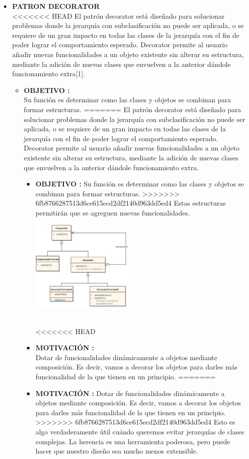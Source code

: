 \documentclass[twoside,twocolumn]{article}
\begin{document}
\begin{itemize}
    \item \textbf{PATRON DECORATOR} \\
<<<<<<< HEAD
    El patrón decorator está diseñado para solucionar problemas donde la jerarquía con subclasificación no puede ser aplicada, o se requiere de un gran impacto en todas las clases de la jerarquía con el fin de poder lograr el comportamiento esperado. Decorator permite al usuario añadir nuevas funcionalidades a un objeto existente sin alterar su estructura, mediante la adición de nuevas clases que envuelven a la anterior dándole funcionamiento extra[1]. 
	\begin{itemize}
		\item \textbf{OBJETIVO :}	\\Su función es determinar como las clases y objetos se combinan para formar estructuras.
=======
    El patrón decorator está diseñado para solucionar problemas donde la jerarquía con subclasificación no puede ser aplicada, o se requiere de un gran impacto en todas las clases de la jerarquía con el fin de poder lograr el comportamiento esperado. Decorator permite al usuario añadir nuevas funcionalidades a un objeto existente sin alterar su estructura, mediante la adición de nuevas clases que envuelven a la anterior dándole funcionamiento extra. 
	\begin{itemize}
		\item \textbf{OBJETIVO :}	Su función es determinar como las clases y objetos se combinan para formar estructuras.
>>>>>>> 6fb8766287513d6ce615ecd2df2140d963dd5ed4
        Estas estructuras permitirán que se agreguen nuevas funcionalidades.
        
        \begin{center}
            \includegraphics[width=5cm]{./img/Imagen5.png} 
        \end{center}
        \\

<<<<<<< HEAD
		\item \textbf{MOTIVACIÓN  :} \\Dotar de funcionalidades dinámicamente a objetos mediante composición. Es decir, vamos a decorar los objetos para darles más funcionalidad de la que tienen en un principio.
=======
		\item \textbf{MOTIVACIÓN  :} Dotar de funcionalidades dinámicamente a objetos mediante composición. Es decir, vamos a decorar los objetos para darles más funcionalidad de la que tienen en un principio.
>>>>>>> 6fb8766287513d6ce615ecd2df2140d963dd5ed4
        Esto es algo verdaderamente útil cuándo queremos evitar jerarquías de clases complejas. La herencia es una herramienta poderosa, pero puede hacer que nuestro diseño sea mucho menos extensible.
        


\end{itemize}
\end{itemize}
\end{itemize}
\end{document}
